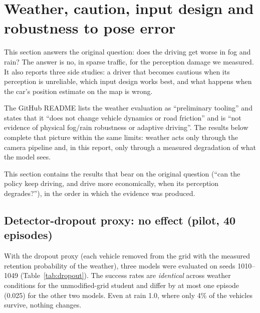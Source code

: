 \section{Weather, caution, input design and robustness to pose error}\label{sec:weather}

\begin{plainwords}
This section answers the original question: does the driving get worse in fog and rain? The answer is no, in sparse traffic, for the perception damage we measured. It also reports three side studies: a driver that becomes cautious when its perception is unreliable, which input design works best, and what happens when the car's position estimate on the map is wrong.
\end{plainwords}
\begin{cautionbox}
The GitHub README lists the weather evaluation as ``preliminary tooling'' and states that it ``does not change vehicle dynamics or road friction'' and is ``not evidence of physical fog/rain robustness or adaptive driving''. The results below complete that picture within the same limits: weather acts only through the camera pipeline and, in this report, only through a measured degradation of what the model sees.
\end{cautionbox}


This section contains the results that bear on the original question (``can the policy keep driving, and drive more economically, when its perception degrades?''), in the order in which the evidence was produced.

\subsection{Detector-dropout proxy: no effect (pilot, 40 episodes)}
With the dropout proxy (each vehicle removed from the grid with the measured retention probability of the weather), three models were evaluated on seeds 1010--1049 (Table~\ref{tab:dropout}). The success rates are \emph{identical} across weather conditions for the unmodified-grid student and differ by at most one episode (0.025) for the other two models. Even at rain 1.0, where only 4\% of the vehicles survive, nothing changes.
\begin{table}[H]\centering\small
\caption{Success under the detector-dropout proxy, sparse traffic, seeds 1010--1049 (pilot; 40 episodes per cell). ``Share of vehicles kept'' is the measured detector retention used by the proxy.}\label{tab:dropout}
\resizebox{\textwidth}{!}{}
\end{table}

